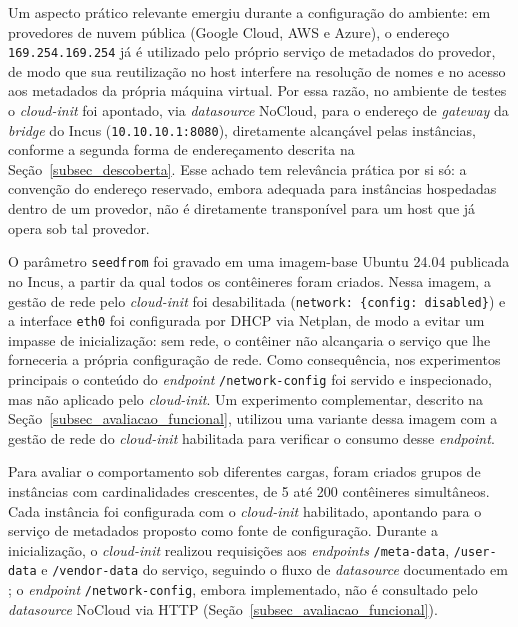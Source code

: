 Um aspecto prático relevante emergiu durante a configuração do ambiente: em provedores de nuvem pública (Google Cloud, AWS e Azure), o endereço \texttt{169.254.169.254} já é utilizado pelo próprio serviço de metadados do provedor, de modo que sua reutilização no host interfere na resolução de nomes e no acesso aos metadados da própria máquina virtual. Por essa razão, no ambiente de testes o \textit{cloud-init} foi apontado, via \textit{datasource} NoCloud, para o endereço de \textit{gateway} da \textit{bridge} do Incus (\texttt{10.10.10.1:8080}), diretamente alcançável pelas instâncias, conforme a segunda forma de endereçamento descrita na Seção~\ref{subsec_descoberta}. Esse achado tem relevância prática por si só: a convenção do endereço reservado, embora adequada para instâncias hospedadas dentro de um provedor, não é diretamente transponível para um host que já opera sob tal provedor.

O parâmetro \texttt{seedfrom} foi gravado em uma imagem-base Ubuntu 24.04 publicada no Incus, a partir da qual todos os contêineres foram criados. Nessa imagem, a gestão de rede pelo \textit{cloud-init} foi desabilitada (\texttt{network: \{config: disabled\}}) e a interface \texttt{eth0} foi configurada por DHCP via Netplan, de modo a evitar um impasse de inicialização: sem rede, o contêiner não alcançaria o serviço que lhe forneceria a própria configuração de rede. Como consequência, nos experimentos principais o conteúdo do \textit{endpoint} \texttt{/network-config} foi servido e inspecionado, mas não aplicado pelo \textit{cloud-init}. Um experimento complementar, descrito na Seção~\ref{subsec_avaliacao_funcional}, utilizou uma variante dessa imagem com a gestão de rede do \textit{cloud-init} habilitada para verificar o consumo desse \textit{endpoint}.

Para avaliar o comportamento sob diferentes cargas, foram criados grupos de instâncias com cardinalidades crescentes, de 5 até 200 contêineres simultâneos. Cada instância foi configurada com o \textit{cloud-init} habilitado, apontando para o serviço de metadados proposto como fonte de configuração. Durante a inicialização, o \textit{cloud-init} realizou requisições aos \textit{endpoints} \texttt{/meta-data}, \texttt{/user-data} e \texttt{/vendor-data} do serviço, seguindo o fluxo de \textit{datasource} documentado em \citep{cloudinit2024}; o \textit{endpoint} \texttt{/network-config}, embora implementado, não é consultado pelo \textit{datasource} NoCloud via HTTP (Seção~\ref{subsec_avaliacao_funcional}).

